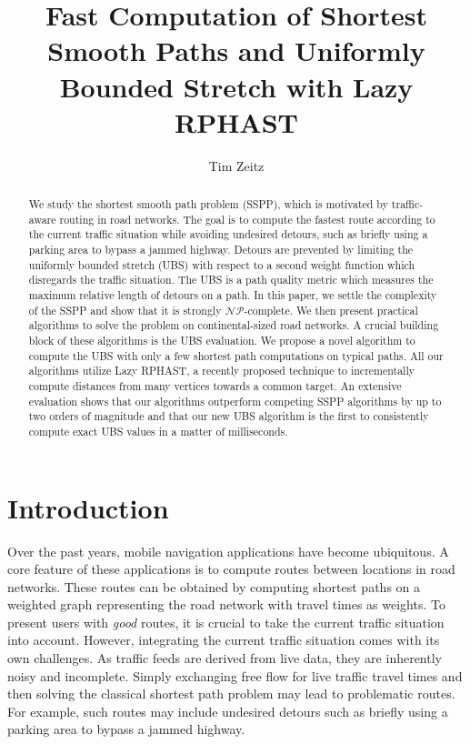 \documentclass[a4paper,UKenglish,cleveref, autoref, thm-restate]{lipics-v2021}
\title{Fast Computation of Shortest Smooth Paths and Uniformly Bounded Stretch with Lazy RPHAST} %
\author{Tim Zeitz}{Karlsruhe Institute of Technology, Germany}{tim.zeitz@kit.edu}{https://orcid.org/0000-0003-4746-3582}{}%
\begin{document}
\maketitle

\begin{abstract}
We study the shortest smooth path problem (SSPP), which is motivated by traffic-aware routing in road networks.
The goal is to compute the fastest route according to the current traffic situation while avoiding undesired detours, such as briefly using a parking area to bypass a jammed highway.
Detours are prevented by limiting the uniformly bounded stretch (UBS) with respect to a second weight function which disregards the traffic situation.
The UBS is a path quality metric which measures the maximum relative length of detours on a path.
In this paper, we settle the complexity of the SSPP and show that it is strongly $\mathcal{NP}$-complete.
We then present practical algorithms to solve the problem on continental-sized road networks.
A crucial building block of these algorithms is the UBS evaluation.
We propose a novel algorithm to compute the UBS with only a few shortest path computations on typical paths.
All our algorithms utilize Lazy RPHAST, a recently proposed technique to incrementally compute distances from many vertices towards a common target.
An extensive evaluation shows that our algorithms outperform competing SSPP algorithms by up to two orders of magnitude and that our new UBS algorithm is the first to consistently compute exact UBS values in a matter of milliseconds.
\end{abstract}

\newpage

\section{Introduction}

Over the past years, mobile navigation applications have become ubiquitous.
A core feature of these applications is to compute routes between locations in road networks.
These routes can be obtained by computing shortest paths on a weighted graph representing the road network with travel times as weights.
To present users with \emph{good} routes, it is crucial to take the current traffic situation into account.
However, integrating the current traffic situation comes with its own challenges.
As traffic feeds are derived from live data, they are inherently noisy and incomplete.
Simply exchanging free flow for live traffic travel times and then solving the classical shortest path problem may lead to problematic routes.
For example, such routes may include undesired detours such as briefly using a parking area to bypass a jammed highway.
\end{document}

